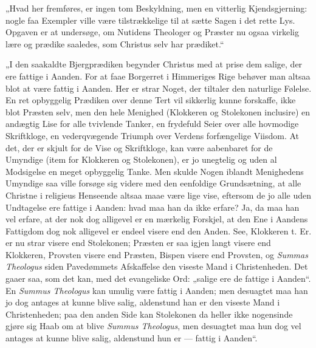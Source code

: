 \documentclass[12pt,a4paper]{book}
\begin{document}
„Hvad her fremføres, er ingen tom Beskyldning, men en vitterlig Kjendsgjerning: nogle
faa Exempler ville være tilstrækkelige til at sætte Sagen i det rette Lys. Opgaven er
at undersøge, om Nutidens Theologer og Præster nu ogsaa virkelig lære og prædike
saaledes, som Christus selv har prædiket.“

„I den saakaldte Bjergprædiken begynder Christus med at prise dem salige, der ere
fattige i Aanden. For at faae Borgerret i Himmeriges Rige behøver man altsaa blot at
være fattig i Aanden. Her er strar Noget, der tiltaler den naturlige Følelse. En ret
opbyggelig Prædiken over denne Tert vil sikkerlig kunne forskaffe, ikke blot Præsten
selv, men den hele Menighed (Klokkeren og Stolekonen inclusire) en andægtig Lise for
alle tvivlende
Tanker, en frydefuld Seier over alle hovmodige Skriftkloge, en vederqvægende Triumph
over Verdens forfængelige Viisdom. At det, der er skjult for de Vise og Skriftkloge,
kan være aabenbaret for de Umyndige (item for Klokkeren og Stolekonen), er jo unegtelig
og uden al Modsigelse en meget opbyggelig Tanke. Men skulde Nogen iblandt Menighedens
Umyndige saa ville forsøge sig videre med den eenfoldige Grundsætning, at alle Christne
i religieus Henseende altsaa maae være lige vise, eftersom de jo alle uden Undtagelse
ere fattige i Aanden: hvad maa han da ikke erfare? Ja, da maa han vel erfare, at der
nok dog alligevel er en mærkelig Forskjel, at den Ene i Aandens Fattigdom dog nok
alligevel er endeel visere end den Anden. See, Klokkeren t. Er. er nu strar visere end
Stolekonen; Præsten er saa igjen langt visere end Klokkeren, Provsten visere end
Præsten, Bispen visere end Provsten, og \textit{Summas Theologus} siden Pavedømmets
Afskaffelse den viseste Mand i Christenheden. Det gaaer saa, som det kan, med det
evangeliske Ord: „salige ere de fattige i Aanden“. En \textit{Summus Theologus} kan
umulig være fattig i Aanden; men desuagtet maa han jo dog antages at kunne blive salig,
aldenstund han er den viseste Mand i Christenheden; paa den anden Side kan Stolekonen
da heller ikke nogensinde gjøre sig Haab om at blive \textit{Summus Theologus}, men
desuagtet maa hun dog vel antages at kunne blive salig, aldenstund hun er --- fattig i
Aanden“.
\end{document}
